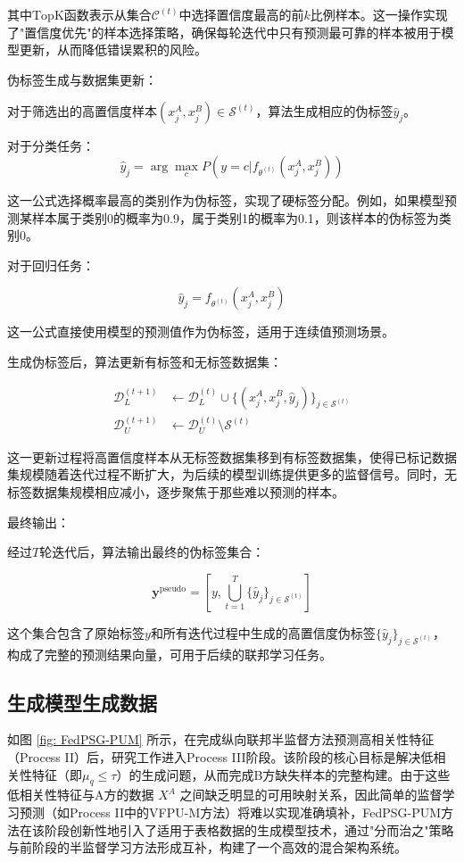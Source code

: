 其中$\text{TopK}$函数表示从集合$\mathcal{C}^{(t)}$中选择置信度最高的前$k$比例样本。这一操作实现了"置信度优先"的样本选择策略，确保每轮迭代中只有预测最可靠的样本被用于模型更新，从而降低错误累积的风险。

伪标签生成与数据集更新：

对于筛选出的高置信度样本$(x^A_j,x^B_j) \in \mathcal{S}^{(t)}$，算法生成相应的伪标签$\hat{y}_j$。

对于分类任务：
\begin{equation}
	\hat{y}_j = \arg\max_c P(y=c|f_{\theta^{(t)}}(x^A_j,x^B_j))
\end{equation}

这一公式选择概率最高的类别作为伪标签，实现了硬标签分配。例如，如果模型预测某样本属于类别0的概率为0.9，属于类别1的概率为0.1，则该样本的伪标签为类别0。

对于回归任务：

\begin{equation}
	\hat{y}_j = f_{\theta^{(t)}}(x^A_j,x^B_j)
\end{equation}

这一公式直接使用模型的预测值作为伪标签，适用于连续值预测场景。

生成伪标签后，算法更新有标签和无标签数据集：

\begin{align}
	\mathcal{D}_L^{(t+1)} &\leftarrow \mathcal{D}_L^{(t)} \cup \{(x^A_j,x^B_j,\hat{y}_j)\}_{j\in\mathcal{S}^{(t)}} \\
	\mathcal{D}_U^{(t+1)} &\leftarrow \mathcal{D}_U^{(t)} \setminus \mathcal{S}^{(t)}
\end{align}


这一更新过程将高置信度样本从无标签数据集移到有标签数据集，使得已标记数据集规模随着迭代过程不断扩大，为后续的模型训练提供更多的监督信号。同时，无标签数据集规模相应减小，逐步聚焦于那些难以预测的样本。

最终输出：

经过$T$轮迭代后，算法输出最终的伪标签集合：

\begin{equation}
	\mathbf{y}^{\text{pseudo}} = \left[ y, \bigcup_{t=1}^{T} \{\hat{y}_j\}_{j \in \mathcal{S}^{(t)}} \right]
\end{equation}


这个集合包含了原始标签$y$和所有迭代过程中生成的高置信度伪标签$\{\hat{y}_j\}_{j \in \mathcal{S}^{(t)}}$，构成了完整的预测结果向量，可用于后续的联邦学习任务。


\subsection{生成模型生成数据}
如图 \ref{fig: FedPSG-PUM} 所示，在完成纵向联邦半监督方法预测高相关性特征（Process II）后，研究工作进入Process III阶段。该阶段的核心目标是解决低相关性特征（即$\mu_q \leq \tau$）的生成问题，从而完成B方缺失样本的完整构建。由于这些低相关性特征与A方的数据 $X^A$ 之间缺乏明显的可用映射关系，因此简单的监督学习预测（如Process II中的VFPU-M方法）将难以实现准确填补，FedPSG-PUM方法在该阶段创新性地引入了适用于表格数据的生成模型技术，通过"分而治之"策略与前阶段的半监督学习方法形成互补，构建了一个高效的混合架构系统。

